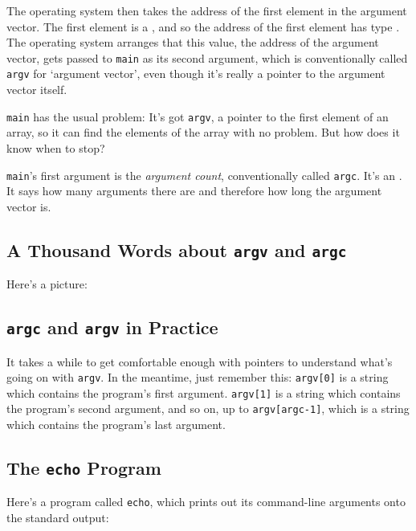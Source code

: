 The operating system then takes the address of the first element in the
argument vector.  The first element is a \Char, and so the address of
the first element has type .  The operating system
arranges that this value, the address of the argument vector, gets
passed to {\tt main} as its second argument, which is conventionally
called {\tt argv} for `argument vector', even though it's really a
pointer to the argument vector itself.

{\tt main} has the usual problem: It's got {\tt argv}, a pointer to the
first element of an array, so it can find the elements of the array with
no problem.  But how does it know when to stop?

{\tt main}'s first argument is the {\em argument count}\/,
conventionally called {\tt argc}.  It's an \int.  It says how many
arguments there are and therefore how long the argument vector is.

\subsection{A Thousand Words about {\tt argv} and {\tt argc}}

Here's a picture:

\vspace{3in}

\subsection{{\tt argc} and {\tt argv} in Practice}

It takes a while to get comfortable enough with pointers to understand
what's going on with {\tt argv}.  In the meantime, just remember this:
{\tt argv[0]} is a string which contains the program's first argument.
{\tt argv[1]} is a string which contains the program's second argument,
and so on, up to {\tt argv[argc-1]}, which is a string which contains
the program's last argument.

\subsection{The {\tt echo} Program}

Here's a program called {\tt echo}, which prints out its command-line
arguments onto the standard output:



